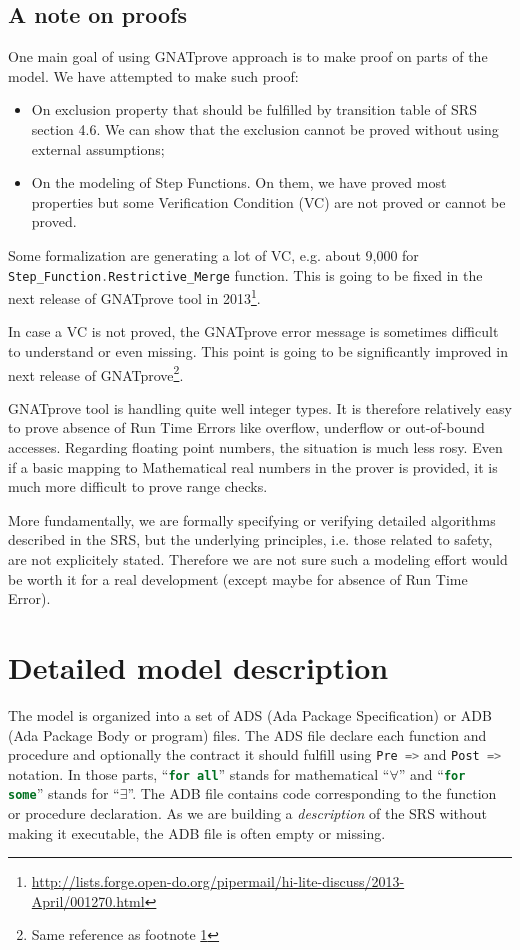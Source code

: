 \documentclass{template/openetcs_report}
\newcommand{\Ada}[1]{\lstinline[language=Ada,basicstyle={\sffamily},framesep=0pt]{#1}}
\begin{document}
\section{A note on proofs}

One main goal of using GNATprove approach is to make proof on parts of
the model. We have attempted to make such proof:
\begin{itemize}
\item On exclusion property that should be fulfilled by transition
  table of SRS section 4.6. We can show that the exclusion cannot be
  proved without using external assumptions;
\item On the modeling of Step Functions. On them, we have proved most
  properties but some Verification Condition (VC) are not proved or
  cannot be proved.
\end{itemize}

Some formalization are generating a lot of VC, e.g. about 9,000 for
\Ada{Step_Function.Restrictive_Merge} function. This is going to be
fixed in the next release of GNATprove tool in
2013\footnote{\label{fn:gnatprove-improvements}\url{http://lists.forge.open-do.org/pipermail/hi-lite-discuss/2013-April/001270.html}}.

In case a VC is not proved, the GNATprove error message is sometimes
difficult to understand or even missing. This point is going to be
significantly improved in next release of GNATprove\footnote{Same
  reference as footnote \ref{fn:gnatprove-improvements}}.

GNATprove tool is handling quite well integer types. It is therefore
relatively easy to prove absence of Run Time Errors like overflow,
underflow or out-of-bound accesses. Regarding floating point numbers,
the situation is much less rosy. Even if a basic mapping to
Mathematical real numbers in the prover is provided, it is much more
difficult to prove range checks.

More fundamentally, we are formally specifying or verifying detailed
algorithms described in the SRS, but the underlying principles,
i.e. those related to safety, are not explicitely stated. Therefore we
are not sure such a modeling effort would be worth it for a real
development (except maybe for absence of Run Time Error).

\chapter{Detailed model description}

The model is organized into a set of ADS (Ada Package Specification)
or ADB (Ada Package Body or program) files. The ADS file declare each
function and procedure and optionally the contract it should fulfill
using \Ada{Pre =>} and \Ada{Post =>} notation. In those parts,
``\Ada{for all}'' stands for mathematical ``$\forall$'' and ``\Ada{for
  some}'' stands for ``$\exists$''. The ADB file contains code
corresponding to the function or procedure declaration. As we are
building a \emph{description} of the SRS without making it executable,
the ADB file is often empty or missing.
\end{document}
